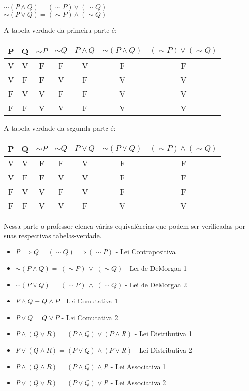 \documentclass[a4paper,11pt,oneside]{book}
\theoremstyle{definition}
\theoremstyle{break}
\begin{document}
\begin{center}
$\sim(P \land Q) = (\sim P) \lor (\sim Q)$ \\
$\sim(P \lor Q) = (\sim P) \land (\sim Q)$
\end{center}

A tabela-verdade da primeira parte é:
\begin{center}
\begin{tabular}{ | c c || c c c || c c | }
\hline
P & Q & $\sim P$ & $\sim Q$ & $P \land Q$ & $\sim (P \land Q)$ & $(\sim P) \lor (\sim Q)$ \\
\hline
V & V & F & F & V & F & F \\
V & F & F & V & F & V & V \\
F & V & V & F & F & V & V \\
F & F & V & V & F & V & V \\
\hline
\end{tabular}
\end{center}

A tabela-verdade da segunda parte é:
\begin{center}
\begin{tabular}{ | c c || c c c || c c | }
\hline
P & Q & $\sim P$ & $\sim Q$ & $P \lor Q$ & $\sim (P \lor Q)$ & $(\sim P) \land (\sim Q)$ \\
\hline
V & V & F & F & V & F & F \\
V & F & F & V & V & F & F \\
F & V & V & F & V & F & F \\
F & F & V & V & F & V & V \\
\hline
\end{tabular}
\end{center}

Nessa parte o professor elenca várias equivalências que podem ser verificadas por suas respectivas tabelas-verdade.

\begin{itemize}
\item $ P \implies Q = (\sim Q) \implies (\sim P) $ - Lei Contrapositiva
\item $ \sim (P \land Q) = \  (\sim P) \ \lor \ (\sim Q) $ - Lei de DeMorgan 1
\item $ \sim (P \lor Q) = \  (\sim P) \ \land \ (\sim Q) $ - Lei de DeMorgan 2
\item $ P \land Q = Q \land P $ - Lei Comutativa 1
\item $ P \lor Q = Q \lor P $ - Lei Comutativa 2
\item $ P \land (Q \lor R) = (P \land Q) \lor (P \land R)$ - Lei Distributiva 1
\item $ P \lor (Q \land R) = (P \lor Q) \land (P \lor R) $ - Lei Distributiva 2
\item $ P \land (Q \land R) = (P \land Q) \land R $ - Lei Associativa 1
\item $ P \lor (Q \lor R) = (P \lor Q) \lor R $ - Lei Associativa 2
\end{itemize}
\end{document}
